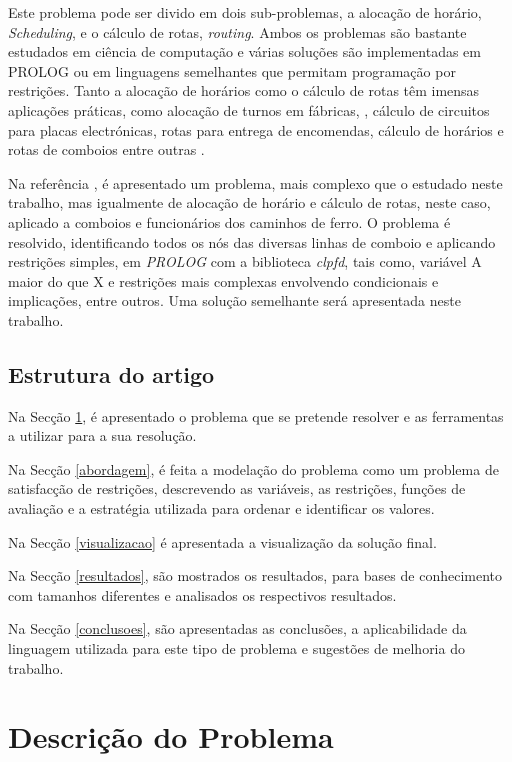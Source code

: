 \documentclass[runningheads]{llncs}
\begin{document}
Este problema pode ser divido em dois sub-problemas, a alocação de horário, \textit{Scheduling}, e o cálculo de rotas, \textit{routing}. Ambos os problemas são bastante estudados em ciência de computação e várias soluções são implementadas em PROLOG ou em linguagens semelhantes que permitam programação por restrições. Tanto a alocação de horários como o cálculo de rotas têm imensas aplicações práticas, como alocação de turnos em fábricas, \cite{ref_article1}, cálculo de circuitos para placas electrónicas, rotas para entrega de encomendas, cálculo de horários e rotas de comboios \cite{ref_article2} entre outras \cite{ref_url1}.

Na referência \cite{ref_article2}, é apresentado um problema, mais complexo que o estudado neste trabalho, mas igualmente de alocação de horário e cálculo de rotas, neste caso, aplicado a comboios e funcionários dos caminhos de ferro. O problema é resolvido, identificando todos os nós das diversas linhas de comboio e aplicando restrições simples, em \textit{PROLOG} com a biblioteca \textit{clpfd}, tais como, variável A maior do que X e restrições mais complexas envolvendo condicionais e implicações, entre outros. Uma solução semelhante será apresentada neste trabalho.

\subsection{Estrutura do artigo}

Na Secção \ref{descricao-problema}, é apresentado o problema que se pretende resolver e as ferramentas a utilizar para a sua resolução.

Na Secção \ref{abordagem}, é feita a modelação do problema como um problema de satisfacção de restrições, descrevendo as variáveis, as restrições, funções de avaliação e a estratégia utilizada para ordenar e identificar os valores.

Na Secção \ref{visualizacao} é apresentada a visualização da solução final.

Na Secção \ref{resultados}, são mostrados os resultados, para bases de conhecimento com tamanhos diferentes e analisados os respectivos resultados.

Na Secção \ref{conclusoes}, são apresentadas as conclusões, a aplicabilidade da linguagem utilizada para este tipo de problema e sugestões de melhoria do trabalho.

\section{Descrição do Problema}\label{descricao-problema}
\end{document}
